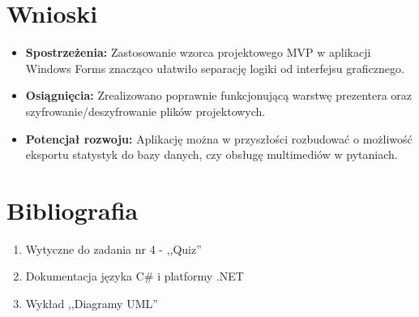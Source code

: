 \documentclass[12pt,a4paper]{article}
\begin{document}
\section{Wnioski}
\begin{itemize}
    \item \textbf{Spostrzeżenia:} Zastosowanie wzorca projektowego MVP w aplikacji Windows Forms znacząco ułatwiło separację logiki od interfejsu graficznego.
    \item \textbf{Osiągnięcia:} Zrealizowano poprawnie funkcjonującą warstwę prezentera oraz szyfrowanie/deszyfrowanie plików projektowych.
    \item \textbf{Potencjał rozwoju:} Aplikację można w przyszłości rozbudować o możliwość eksportu statystyk do bazy danych, czy obsługę multimediów w pytaniach.
\end{itemize}

\section{Bibliografia}
\begin{enumerate}
    \item Wytyczne do zadania nr 4 - ,,Quiz''
    \item Dokumentacja języka C\# i platformy .NET
    \item Wykład ,,Diagramy UML''
\end{enumerate}
\end{document}
